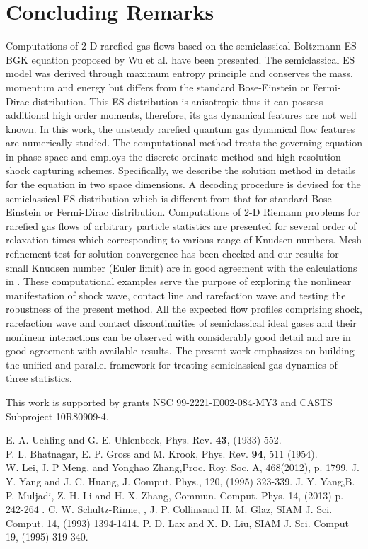 \documentclass[twocolumn,prX]{revtex4} %
\begin{document}
\section{ Concluding Remarks}
Computations of 2-D rarefied gas flows based on the semiclassical Boltzmann-ES-BGK equation proposed by Wu et al. \cite{Wu2012} have been presented.  The semiclassical ES model was derived through maximum entropy principle and conserves the mass, momentum and energy but differs from the standard Bose-Einstein or Fermi-Dirac distribution. This ES distribution is anisotropic thus it can possess additional high order moments, therefore, its gas dynamical features are not well known. In this work, the unsteady rarefied quantum gas dynamical flow features are numerically studied.  The computational method treats the governing equation in phase space and employs the discrete ordinate method and high resolution shock capturing schemes. Specifically, we describe the solution method in details for the equation in two space dimensions.   A decoding procedure is devised for the semiclassical ES distribution which is different from that for standard Bose-Einstein or Fermi-Dirac distribution.  Computations of 2-D Riemann problems for rarefied gas flows of arbitrary particle statistics are presented for several order of relaxation times which corresponding to various range of Knudsen numbers.  Mesh refinement test for solution convergence has been checked and our results for small Knudsen number (Euler limit) are in good agreement with the calculations in \cite{Laxliu95}\cite{schultzrinne}.    These computational examples serve the purpose of exploring the nonlinear manifestation of shock wave, contact line and rarefaction wave and testing the robustness of the present method. All the expected flow profiles comprising shock, rarefaction wave and contact discontinuities of semiclassical ideal gases and their nonlinear interactions can be observed with considerably good detail and are in good agreement with available results. The present work emphasizes on building the unified and parallel framework for treating semiclassical gas dynamics of three statistics. 

This work is supported by grants NSC 99-2221-E002-084-MY3 and CASTS Subproject
10R80909-4.

\vspace*{-.25cm}
\begin{thebibliography}{1}
 E. A. Uehling and G. E. Uhlenbeck, Phys. Rev. {\bf 43}, (1933) 552. \\
 P. L. Bhatnagar, E. P. Gross and M. Krook, Phys. Rev. {\bf 94}, 511 (1954). \\
 W. Lei, J. P Meng, and Yonghao Zhang,Proc. Roy. Soc. A, 468(2012), p. 1799.
 J. Y. Yang and J. C. Huang, J. Comput. Phys., 120, (1995) 323-339.
 J. Y. Yang,B. P. Muljadi, Z. H. Li and H. X. Zhang, Commun. Comput. Phys. 14, (2013) p. 242-264 .
 C. W. Schultz-Rinne, , J. P. Collinsand H. M. Glaz, SIAM J. Sci. Comput. 14, (1993) 1394-1414.
 P. D. Lax and X. D. Liu, SIAM J. Sci. Comput 19, (1995) 319-340.

\end{thebibliography}
%
\end{document}
